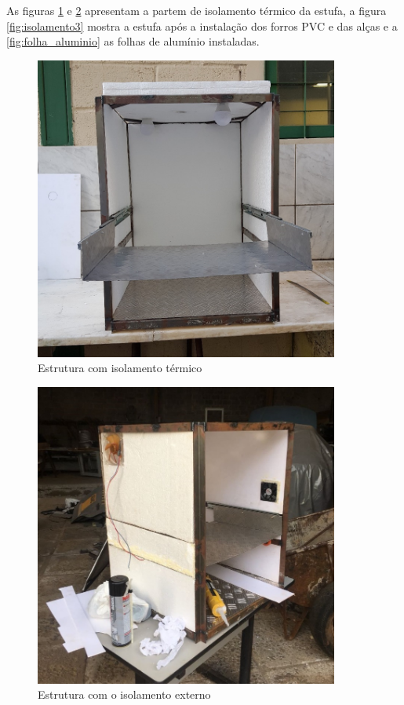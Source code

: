 As figuras \ref{fig:isolamento1} e \ref{fig:isolamento2} apresentam a partem de isolamento térmico da estufa, a figura \ref{fig:isolamento3} mostra a estufa após a instalação dos forros PVC e das alças e a \ref{fig:folha_aluminio} as folhas de alumínio instaladas.
\begin{figure}[H]
	\centering
	\includegraphics[width=10cm]{figuras/isolamento1.png}
	\caption{Estrutura com isolamento térmico}
	\label{fig:isolamento1}
\end{figure}
\begin{figure}[H]
	\centering
	\includegraphics[width=10cm]{figuras/isolamento2.png}
	\caption{Estrutura com o isolamento externo}
	\label{fig:isolamento2}
\end{figure}
